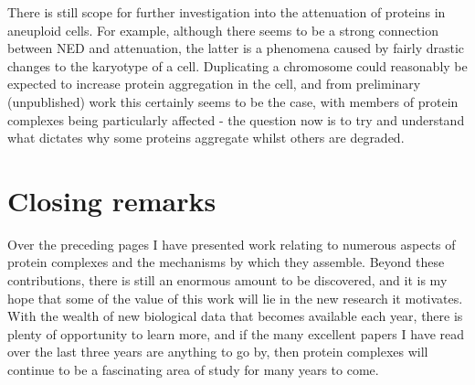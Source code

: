 \documentclass[a4paper,11pt,twoside,openright]{scrbook}
\begin{document}
There is still scope for further investigation into the attenuation of proteins in aneuploid cells. For example, although there seems to be a strong connection between NED and attenuation, the latter is a phenomena caused by fairly drastic changes to the karyotype of a cell. Duplicating a chromosome could reasonably be expected to increase protein aggregation in the cell, and from preliminary (unpublished) work this certainly seems to be the case, with members of protein complexes being particularly affected - the question now is to try and understand what dictates why some proteins aggregate whilst others are degraded.

\section{Closing remarks}
Over the preceding pages I have presented work relating to numerous aspects of protein complexes and the mechanisms by which they assemble. Beyond these contributions, there is still an enormous amount to be discovered, and it is my hope that some of the value of this work will lie in the new research it motivates. With the wealth of new biological data that becomes available each year, there is plenty of opportunity to learn more, and if the many excellent papers I have read over the last three years are anything to go by, then protein complexes will continue to be a fascinating area of study for many years to come.
\end{document}
